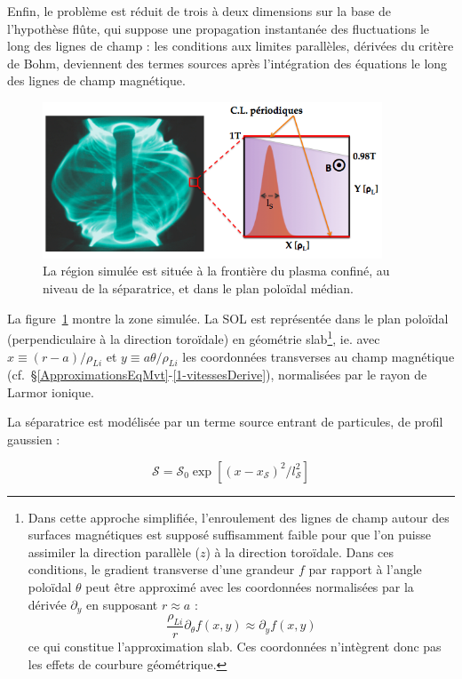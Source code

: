 \begin{refsection}
Enfin, le problème est réduit de trois à deux dimensions sur la base de l'hypothèse
flûte, qui suppose une propagation instantanée des fluctuations le long des
lignes de champ : les conditions aux limites parallèles, dérivées du critère de
Bohm, deviennent des termes sources après l'intégration des équations le long
des lignes de champ magnétique.

\begin{figure}[!htbp]
\centering
    \includegraphics[width=0.9\textwidth]{figures/2-tokamSimDomain.png}
    \caption{La région simulée est située à la frontière du plasma confiné,
    au niveau de la séparatrice, et dans le plan poloïdal médian.}
    \label{2-figTokamGeom}
\end{figure}

La figure~\ref{2-figTokamGeom} montre la zone simulée. La SOL est représentée dans le plan
poloïdal (perpendiculaire à la direction toroïdale)
en géométrie slab\footnote{Dans cette approche simplifiée, l'enroulement des
lignes de champ autour des surfaces magnétiques est supposé suffisamment
faible pour que l'on puisse assimiler la direction parallèle ($z$) à la
direction toroïdale. Dans ces conditions, le gradient transverse d'une
grandeur $f$ par rapport à l'angle poloïdal $\theta$ peut être approximé avec
les coordonnées normalisées par la dérivée $\partial_y$ en supposant $r\approx
a$ :
$$\frac{\rho_{Li}}{r}\partial_\theta f(x,y)\approx\partial_y
f(x,y)$$
ce qui constitue l'approximation slab. Ces
coordonnées n'intègrent donc pas les effets de courbure géométrique.}, ie.
avec $x\equiv(r-a)/\rho_{Li}$ et $y\equiv a\theta/\rho_{Li}$ les coordonnées
transverses au champ magnétique
(cf.~\S\ref{ApproximationsEqMvt}-\ref{1-vitessesDerive}), normalisées par le rayon de Larmor ionique.

La séparatrice est modélisée par un terme source entrant de particules, de profil gaussien :

\begin{equation}
\mathcal S=\mathcal{S}_0 \exp[(x-x_\mathcal{S})^2/l_\mathcal{S}^2]
\end{equation}


\end{refsection}
